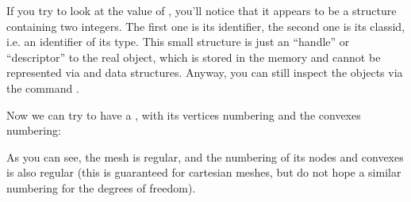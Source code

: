 \documentclass[a4paper,11pt,english]{sphinxmanual}
\begin{document}
\begin{sphinxVerbatim}[commandchars=\\\{\}]
\PYG{p}{[}\PYG{p}{]}\PYG{p}{[}\PYG{p}{]}
\end{sphinxVerbatim}

\sphinxAtStartPar
If you try to look at the value of , you’ll notice that it appears to be a
structure containing two integers. The first one is its identifier, the second one
is its class\sphinxhyphen{}id, i.e. an identifier of its type. This small structure is just an
“handle” or “descriptor” to the real object, which is stored in the  memory
and cannot be represented via  and  data structures. Anyway, you can still inspect the  objects via the command .

\sphinxAtStartPar
Now we can try to have a , with its vertices numbering and the
convexes numbering:

\begin{sphinxVerbatim}[commandchars=\\\{\}]
\end{sphinxVerbatim}

\sphinxAtStartPar
As you can see, the mesh is regular, and the numbering of its nodes and convexes
is also regular (this is guaranteed for cartesian meshes, but do not hope a
similar numbering for the degrees of freedom).
\end{document}
